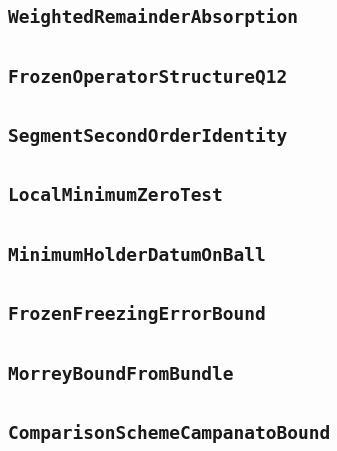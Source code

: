\documentclass[11pt]{amsart}
\theoremstyle{definition}
\begin{document}
\subsection{\texorpdfstring{\texttt{WeightedRemainderAbsorption}}{WeightedRemainderAbsorption}}\label{node:WeightedRemainderAbsorption}


\subsection{\texorpdfstring{\texttt{FrozenOperatorStructureQ12}}{FrozenOperatorStructureQ12}}\label{node:FrozenOperatorStructureQ12}


\subsection{\texorpdfstring{\texttt{SegmentSecondOrderIdentity}}{SegmentSecondOrderIdentity}}\label{node:SegmentSecondOrderIdentity}


\subsection{\texorpdfstring{\texttt{LocalMinimumZeroTest}}{LocalMinimumZeroTest}}\label{node:LocalMinimumZeroTest}


\subsection{\texorpdfstring{\texttt{MinimumHolderDatumOnBall}}{MinimumHolderDatumOnBall}}\label{node:MinimumHolderDatumOnBall}


\subsection{\texorpdfstring{\texttt{FrozenFreezingErrorBound}}{FrozenFreezingErrorBound}}\label{node:FrozenFreezingErrorBound}


\subsection{\texorpdfstring{\texttt{MorreyBoundFromBundle}}{MorreyBoundFromBundle}}\label{node:MorreyBoundFromBundle}


\subsection{\texorpdfstring{\texttt{ComparisonSchemeCampanatoBound}}{ComparisonSchemeCampanatoBound}}\label{node:ComparisonSchemeCampanatoBound}

\end{document}
